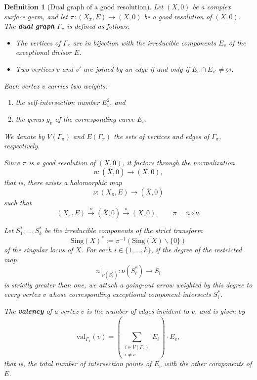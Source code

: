 \documentclass[reqno,dvipsnames,12pt]{amsart}
\renewcommand{\setminus}{\smallsetminus}
\newtheorem{defi}[thm]{Definition}
\begin{document}
\begin{defi}[Dual graph of a good resolution]
Let \((X,0)\) be a complex surface germ, and let $\pi : (X_\pi, E) \to (X,0)$ be a good resolution of \((X,0)\). The \textbf{dual graph} \(\Gamma_\pi\) is defined as follows:

\begin{itemize}
\item The vertices of \(\Gamma_\pi\) are in bijection with the irreducible components \(E_v\) of the exceptional divisor \(E\).
\item Two vertices \(v\) and \(v'\) are joined by an edge if and only if \(E_v \cap E_{v'} \neq \varnothing\).
\end{itemize}

Each vertex \(v\) carries two weights:
\begin{enumerate}
\item the self-intersection number \(E_v^2\), and
\item the genus \(g_v\) of the corresponding curve \(E_v\).
\end{enumerate}

We denote by \(V(\Gamma_\pi)\) and \(E(\Gamma_\pi)\) the sets of vertices and edges of \(\Gamma_\pi\), respectively.

Since \(\pi\) is a good resolution of \((X,0)\), it factors through the normalization
\[
n : (\overline{X},0) \to (X,0),
\]
that is, there exists a holomorphic map
\[
\nu : (X_\pi, E) \to (\overline{X},0)
\]
such that
\[
(X_\pi, E) \xrightarrow{\ \nu\ } (\overline{X},0) \xrightarrow{\ n\ } (X,0),
\qquad \pi = n \circ \nu.
\]

Let \(S_1^*,\dots,S_k^*\) be the irreducible components of the strict transform
\[
\mathrm{Sing}(X)^* := \overline{\pi^{-1}(\mathrm{Sing}(X) \setminus \{0\})}
\]
of the singular locus of \(X\). For each \(i \in \{1,\dots,k\}\), if the degree of the restricted map
\[
n\big|_{\nu(S_i^*)} : \nu(S_i^*) \to S_i
\]
is strictly greater than one, we attach a \emph{going-out arrow} weighted by this degree to every vertex \(v\) whose corresponding exceptional component intersects \(S_i^*\). 

The \textbf{valency} of a vertex \(v\) is the number of edges incident to \(v\), and is given by
\[
\mathrm{val}_{\Gamma_\pi}(v)
=
\left( \sum_{\substack{i \in V(\Gamma_\pi) \\ i \neq v}} E_i \right) \cdot E_v,
\]
that is, the total number of intersection points of \(E_v\) with the other components of \(E\).
\end{defi}
\end{document}
